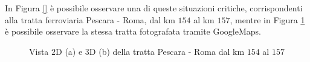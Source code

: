 In Figura \ref{} è possibile osservare una di queste situazioni critiche, corrispondenti alla tratta ferroviaria Pescara - Roma, dal km $154$ al km $157$, mentre in Figura \ref{esempiogalleria} è possibile osservare la stessa tratta fotografata tramite GoogleMaps.
\begin{figure}[bth]
\myfloatalign
{} \quad
{} 
\caption{ Vista $2$D (a) e $3$D (b) della tratta Pescara - Roma dal km $154$ al $157$}
\label{esempiogalleria}
\end{figure}

